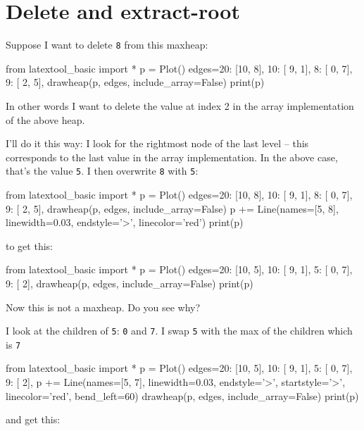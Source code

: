 \section{Delete and extract-root}

Suppose I want to delete
  \texttt{8}
  from this maxheap:

  \begin{python}
from latextool_basic import *
p = Plot()
edges={20: [10, 8],
       10: [ 9, 1],
        8: [ 0, 7],
        9: [ 2, 5],
       }
drawheap(p, edges, include_array=False)
print(p)
\end{python}

In other words I want to delete the value at index 2
in the array implementation of the above heap.

I'll do it this way:
I look for the rightmost node of the last level --
this corresponds to the last value in the array implementation.
In the above case, that's the value \texttt{5}.
I then overwrite \texttt{8} with \texttt{5}:

\begin{python}
from latextool_basic import *
p = Plot()
edges={20: [10, 8],
       10: [ 9, 1],
        8: [ 0, 7],
        9: [ 2, 5],
       }
drawheap(p, edges, include_array=False)
p += Line(names=[5, 8], linewidth=0.03, endstyle='>', linecolor='red')
print(p)
\end{python}

to get this:

\begin{python}
from latextool_basic import *
p = Plot()
edges={20: [10, 5],
       10: [ 9, 1],
        5: [ 0, 7],
        9: [ 2],
       }
drawheap(p, edges, include_array=False)
print(p)
\end{python}

Now this is not a maxheap. Do you see why?

I look at the children of \texttt{5}: \texttt{0} and \texttt{7}.
I swap \texttt{5} with the max of the children which is \texttt{7}

\begin{python}
from latextool_basic import *
p = Plot()
edges={20: [10, 5],
       10: [ 9, 1],
        5: [ 0, 7],
        9: [ 2],
      }
p += Line(names=[5, 7], linewidth=0.03, endstyle='>',
      startstyle='>', linecolor='red', bend_left=60)
drawheap(p, edges, include_array=False)
print(p)
\end{python}

and get this:


